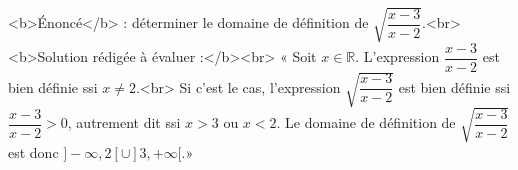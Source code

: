 <b>Énoncé</b> : déterminer le domaine de définition de $\sqrt{\dfrac{x-3}{x-2}}$.<br> <b>Solution rédigée à évaluer :</b><br>  « Soit $x\in\mathbb{R}$. L'expression $\dfrac{x-3}{x-2}$ est bien définie ssi $x\neq 2$.<br> Si c'est le cas, l'expression $\sqrt{\dfrac{x-3}{x-2}}$ est bien définie ssi $\dfrac{x-3}{x-2}>0$, autrement dit ssi $x>3$ ou $x<2$. Le domaine de définition de $\sqrt{\dfrac{x-3}{x-2}}$ est donc $]-\infty,2[\cup ]3,+\infty[$.»

\begin{reponses}
\end{reponses}

\begin{comment}
L'étape avec «$>0$» est incorrecte, la racine carrée de $0$ est bien définie.
\end{comment}

